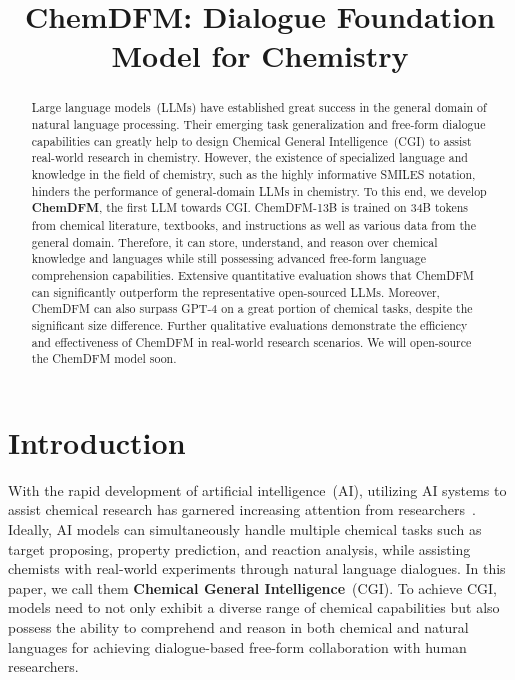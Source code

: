 \title{ChemDFM: Dialogue Foundation Model for Chemistry}



\maketitle
\begin{abstract}
Large language models~(LLMs) have established great success in the general domain of natural language processing.
Their emerging task generalization and free-form dialogue capabilities can greatly
help to design Chemical General Intelligence~(CGI) to assist real-world research in chemistry.
However, the existence of specialized language and knowledge in the field of chemistry, such as the highly informative SMILES notation, hinders the performance of general-domain LLMs in chemistry.
To this end, we develop \textbf{ChemDFM}, the first LLM towards CGI. ChemDFM-13B is trained on 34B tokens from chemical literature, textbooks, and instructions
as well as various data from the general domain. 
Therefore, it can store, understand, and reason over chemical knowledge and languages while still possessing advanced free-form language comprehension capabilities.
Extensive quantitative evaluation shows that ChemDFM can significantly outperform the representative open-sourced LLMs. Moreover, ChemDFM can also surpass GPT-4 on a great portion of chemical tasks, despite the significant size difference.
Further qualitative evaluations demonstrate the efficiency and effectiveness of ChemDFM in real-world research scenarios. We will open-source the ChemDFM model soon.

\end{abstract}
\section{Introduction}

With the rapid development of artificial intelligence~(AI), utilizing AI systems to assist chemical research has garnered increasing attention from researchers~\cite{hatakeyama2023prompt,boiko2023autonomous}. Ideally, AI models can simultaneously handle multiple chemical tasks such as target proposing, property prediction, and reaction analysis, while assisting chemists with real-world experiments through natural language dialogues. In this paper, we call them \textbf{Chemical General Intelligence}~(CGI). To achieve CGI, models need to not only exhibit a diverse range of chemical capabilities but also possess the ability to comprehend and reason in both chemical and natural languages for achieving dialogue-based free-form collaboration with human researchers.

